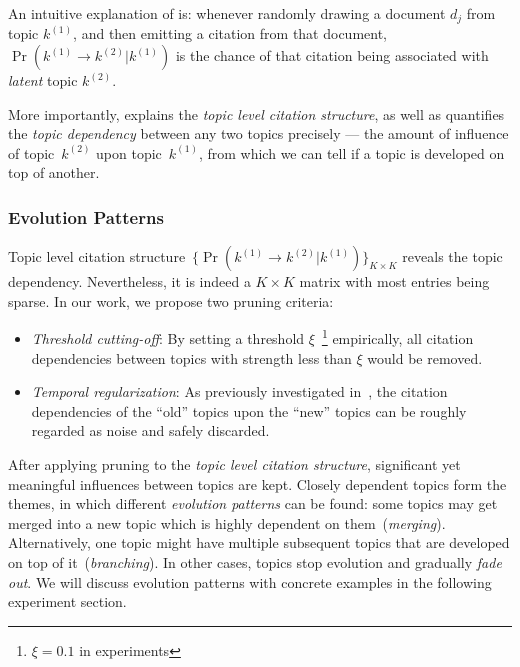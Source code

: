 An intuitive explanation of  is:
whenever randomly drawing a document $d_j$ from topic $k^{(1)}$, and then
emitting a citation from that document, $\Pr(k^{(1)} \rightarrow k^{(2)} |
k^{(1)})$ is the chance of that citation being associated with \emph{latent}
topic $k^{(2)}$.


More importantly,  explains the
\emph{topic level citation structure}, as well as quantifies the \emph{topic
dependency} between any two topics precisely --- the amount of influence of
topic~$k^{(2)}$ upon topic~$k^{(1)}$, from which we can tell if a topic is
developed on top of another.

\subsubsection{Evolution Patterns}

Topic level citation structure~{$\{\Pr(k^{(1)} \rightarrow k^{(2)} |
k^{(1)})\}_{K\times K}$} reveals the topic dependency. Nevertheless, it is
indeed a $K \times K$ matrix with most entries being sparse. In our work, we
propose two pruning criteria:

\begin{itemize}
\item \emph{Threshold cutting-off}: By setting a threshold
  $\xi$~\footnote{{$\xi = 0.1$ in experiments}} empirically, all
  citation dependencies between topics with strength less than $\xi$ would be
  removed.
\item \emph{Temporal regularization}: As previously investigated
  in~\cite{jo2011web,mei2005discovering}, the citation dependencies of the
  ``old'' topics upon the ``new'' topics can be roughly regarded as noise and
  safely discarded.
\end{itemize}

After applying pruning to the \emph{topic level citation structure}, significant
yet meaningful influences between topics are kept. Closely dependent topics form
the themes, in which different \emph{evolution patterns} can be found: some
topics may get merged into a new topic which is highly dependent on
them~(\emph{merging}). Alternatively, one topic might have multiple subsequent
topics that are developed on top of it~(\emph{branching}). In other cases,
topics stop evolution and gradually \emph{fade out}. We will discuss evolution
patterns with concrete examples in the following experiment section.



